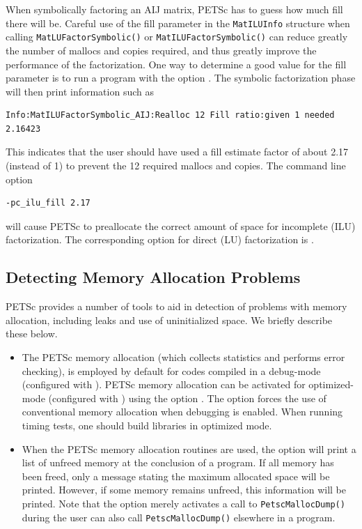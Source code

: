 {{{When symbolically factoring an AIJ matrix, PETSc has to guess
how much fill there will be.  Careful use of the fill parameter in the
\lstinline{MatILUInfo} structure
when calling \lstinline{MatLUFactorSymbolic()} or \lstinline{MatILUFactorSymbolic()}
can reduce greatly the number of mallocs and copies required, and thus
greatly improve the performance of the factorization.  One way to
determine a good value for the fill parameter is to run a program with the option .
The symbolic factorization phase will then print information such as
\begin{lstlisting}
Info:MatILUFactorSymbolic_AIJ:Realloc 12 Fill ratio:given 1 needed 2.16423
\end{lstlisting}
This indicates that the user should have used a fill estimate factor of
about 2.17 (instead of 1) to prevent the 12 required mallocs and copies.
The command line option   
\begin{lstlisting}
-pc_ilu_fill 2.17
\end{lstlisting}
will cause PETSc to preallocate the correct amount of space for incomplete
(ILU) factorization.  The corresponding option for direct (LU) factorization
is .

\subsection{Detecting Memory Allocation Problems}

PETSc provides a number of tools to aid in detection of problems
with memory allocation, including leaks and use of uninitialized space.
We briefly describe these below.
 

\begin{itemize}

\item The PETSc memory allocation (which collects statistics and
performs error checking), is employed by default for codes compiled in
a debug-mode (configured with ).  PETSc memory
allocation can be activated for optimized-mode (configured with
) using the option . The option
 forces the use of conventional memory allocation when
debugging is enabled.  When running timing tests, one should build
libraries in optimized mode.

\item When the PETSc memory allocation routines are used, the option
 will print a list of unfreed memory at the conclusion of a
program.  If all memory has been freed, only a message stating
the maximum allocated space will be printed.  However, if some memory
remains unfreed, this information will be printed.  Note that the
option  merely activates a call to \lstinline{PetscMallocDump()} during
 the user can also call \lstinline{PetscMallocDump()} elsewhere
in a program.


\end{itemize}}}}
